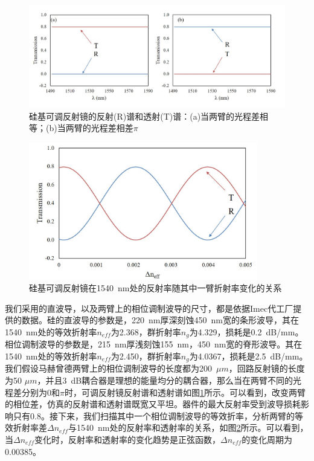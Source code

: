 \begin{figure}[htb]
	\centering
	\includegraphics[width=16cm]{./Pictures/chapt5_tunable_reflection_mirror_spec.jpg}
	\caption{硅基可调反射镜的反射(R)谱和透射(T)谱：(a)当两臂的光程差相等；(b)当两臂的光程差相差$\pi$}
	\label{chapt5_tunable_reflection_mirror_spec}
\end{figure}
\begin{figure}[htb]
	\centering
	\includegraphics[width=10cm]{./Pictures/chapt5_tunable_reflection_mirror_spec_single.jpg}
	\caption{硅基可调反射镜在1540~nm处的反射率随其中一臂折射率变化的关系}
	\label{chapt5_tunable_reflection_mirror_spec_single}
\end{figure}

我们采用的直波导，以及两臂上的相位调制波导的尺寸，都是依据Imec代工厂提供的数据\cite{Imec}。硅的直波导的参数是，220~nm厚深刻蚀450~nm宽的条形波导，其在1540~nm处的等效折射率$n_{eff}$为2.368，群折射率$n_{g}$为4.329，损耗是0.2~dB/mm。相位调制波导的参数是，215~nm厚浅刻蚀155~nm，450~nm宽的脊形波导。其在1540~nm处的等效折射率$n_{eff}$为2.450，群折射率$n_{g}$为4.0367，损耗是2.5~dB/mm。我们假设马赫曾德两臂上的相位调制波导的长度都为200~$\mu m$，回路反射镜的长度为50 $\mu m$，并且3~dB耦合器是理想的能量均分的耦合器，那么当在两臂不同的光程差分别为0和$\pi$时，可调反射镜反射谱和透射谱如图\ref{chapt5_tunable_reflection_mirror_spec}所示。可以看到，改变两臂的相位差，仿真的反射谱和透射谱既宽又平坦。器件的最大反射率受到波导损耗影响只有0.8。接下来，我们扫描其中一个相位调制波导的等效折率，分析两臂的等效折射率差$\Delta n_{eff}$与1540~nm处的反射率和透射率的关系，如图\ref{chapt5_tunable_reflection_mirror_spec_single}所示。可以看到，当$\Delta n_{eff}$变化时，反射率和透射率的变化趋势是正弦函数，$\Delta n_{eff}$的变化周期为0.00385。

